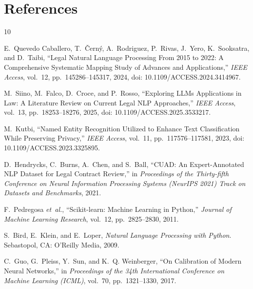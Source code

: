\chapter{References}
\label{ch:references}

\begingroup
\renewcommand{\chapter}[2]{}%
\begin{thebibliography}{10}

E.~Quevedo Caballero, T.~{\v{C}}ern{\'y}, A.~Rodriguez, P.~Rivas, J.~Yero, K.~Sooksatra, and D.~Taibi,
``Legal Natural Language Processing From 2015 to 2022: A Comprehensive Systematic Mapping Study of Advances and Applications,''
\textit{IEEE Access}, vol.~12, pp.~145286--145317, 2024, doi: 10.1109/ACCESS.2024.3414967.

M.~Siino, M.~Falco, D.~Croce, and P.~Rosso,
``Exploring LLMs Applications in Law: A Literature Review on Current Legal NLP Approaches,''
\textit{IEEE Access}, vol.~13, pp.~18253--18276, 2025, doi: 10.1109/ACCESS.2025.3533217.

M.~Kutbi,
``Named Entity Recognition Utilized to Enhance Text Classification While Preserving Privacy,''
\textit{IEEE Access}, vol.~11, pp.~117576--117581, 2023, doi: 10.1109/ACCESS.2023.3325895.

D.~Hendrycks, C.~Burns, A.~Chen, and S.~Ball,
``CUAD: An Expert-Annotated NLP Dataset for Legal Contract Review,''
in \textit{Proceedings of the Thirty-fifth Conference on Neural Information Processing Systems (NeurIPS 2021) Track on Datasets and Benchmarks}, 2021.

F.~Pedregosa \textit{et~al.},
``Scikit-learn: Machine Learning in Python,''
\textit{Journal of Machine Learning Research}, vol.~12, pp.~2825--2830, 2011.

S.~Bird, E.~Klein, and E.~Loper,
\textit{Natural Language Processing with Python}. Sebastopol, CA: O'Reilly Media, 2009.

C.~Guo, G.~Pleiss, Y.~Sun, and K.~Q. Weinberger,
``On Calibration of Modern Neural Networks,''
in \textit{Proceedings of the 34th International Conference on Machine Learning (ICML)}, vol.~70, pp.~1321--1330, 2017.


\end{thebibliography}

